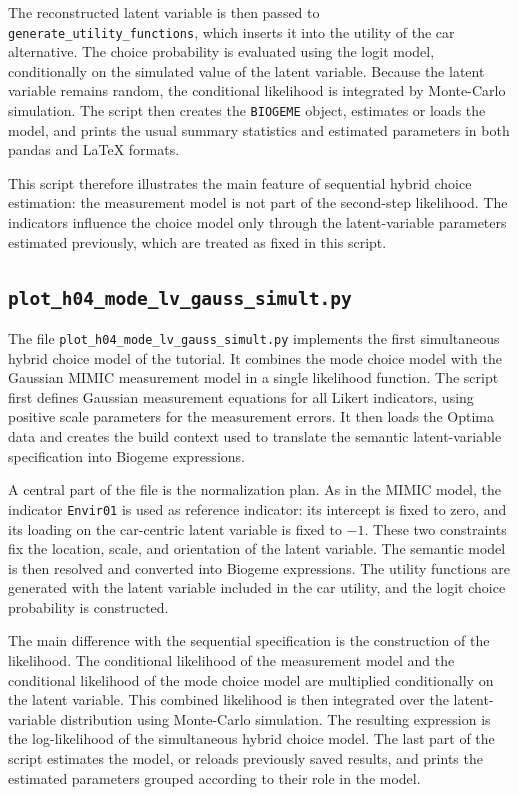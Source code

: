 \documentclass[12pt,a4paper]{article}
\begin{document}
The reconstructed latent variable is then passed to
\lstinline$generate_utility_functions$, which inserts it into the
utility of the car alternative. The choice probability is evaluated
using the logit model, conditionally on the simulated value of the
latent variable. Because the latent variable remains random, the
conditional likelihood is integrated by Monte-Carlo simulation. The
script then creates the \lstinline$BIOGEME$ object, estimates or loads
the model, and prints the usual summary statistics and estimated
parameters in both pandas and \LaTeX{} formats.

This script therefore illustrates the main feature of sequential
hybrid choice estimation: the measurement model is not part of the
second-step likelihood. The indicators influence the choice model only
through the latent-variable parameters estimated previously, which are
treated as fixed in this script.

\subsection{\lstinline$plot_h04_mode_lv_gauss_simult.py$}
\label{sec:plot_h04_mode_lv_gauss_simult.py}


The file \lstinline$plot_h04_mode_lv_gauss_simult.py$ implements the
first simultaneous hybrid choice model of the tutorial. It combines
the mode choice model with the Gaussian MIMIC measurement model in a
single likelihood function. The script first defines Gaussian
measurement equations for all Likert indicators, using positive scale
parameters for the measurement errors. It then loads the Optima data
and creates the build context used to translate the semantic
latent-variable specification into Biogeme expressions.

A central part of the file is the normalization plan. As in the MIMIC
model, the indicator \lstinline$Envir01$ is used as reference
indicator: its intercept is fixed to zero, and its loading on the
car-centric latent variable is fixed to \(-1\). These two constraints
fix the location, scale, and orientation of the latent variable. The
semantic model is then resolved and converted into Biogeme
expressions. The utility functions are generated with the latent
variable included in the car utility, and the logit choice probability
is constructed.

The main difference with the sequential specification is the
construction of the likelihood. The conditional likelihood of the
measurement model and the conditional likelihood of the mode choice
model are multiplied conditionally on the latent variable. This
combined likelihood is then integrated over the latent-variable
distribution using Monte-Carlo simulation. The resulting expression is
the log-likelihood of the simultaneous hybrid choice model. The last
part of the script estimates the model, or reloads previously saved
results, and prints the estimated parameters grouped according to
their role in the model.
\end{document}
